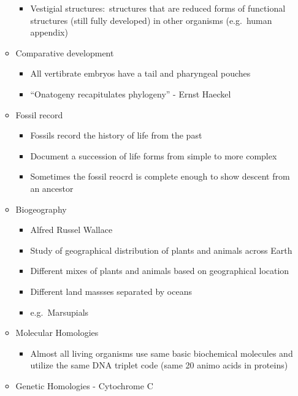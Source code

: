 \documentclass[12pt]{article}
\begin{document}
\begin{itemize}
\begin{itemize}
\begin{itemize}
                \item Vestigial structures:\ structures that are reduced forms of functional structures (still fully developed) in other organisms (e.g.\ human appendix)
            \end{itemize}
            \item Comparative development
            \begin{itemize}
                \item All vertibrate embryos have a tail and pharyngeal pouches
                \item ``Onatogeny recapitulates phylogeny'' - Ernst Haeckel
            \end{itemize}
            \item Fossil record
            \begin{itemize}
                \item Fossils record the history of life from the past
                \item Document a succession of life forms from simple to more complex
                \item Sometimes the fossil reocrd is complete enough to show descent from an ancestor
            \end{itemize}
            \item Biogeography
            \begin{itemize}
                \item Alfred Russel Wallace
                \item Study of geographical distribution of plants and animals across Earth
                \item Different mixes of plants and animals based on geographical location
                \item Different land massses separated by oceans
                \item e.g.\ Marsupials
            \end{itemize}
            \item Molecular Homologies
            \begin{itemize}
                \item Almost all living organisms use same basic biochemical molecules and utilize the same DNA triplet code (same 20 animo acids in proteins)
            \end{itemize}
            \item Genetic Homologies - Cytochrome C
            \begin{itemize}

\end{itemize}
\end{itemize}
\end{itemize}
\end{document}
